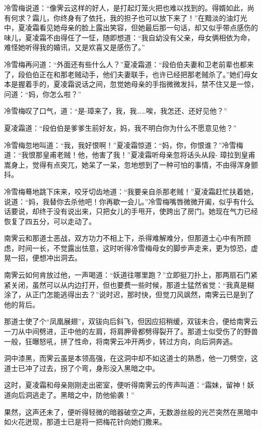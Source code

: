 \documentclass[12pt,oneside]{book}
\begin{document}
冷雪梅说道：``像霁云这样的好人，是打起灯笼火把也难以找到的。得婿如此，尚有何求？霜儿，你终身有了依托，我的担子也可以放下来了！''在黯淡的油灯光中，夏凌霜看见她母亲的脸上露出笑容，但她最后那一句话，却又似乎带点感伤的味儿，夏凌霜不由得任了一怔，随即想道：``我自幼没有父亲，母女俩相依为命，难怪她听得我的婚讯，又是欢喜又是感伤了。''

冷雪梅再问道：``外面还有些什么人？''夏凌霜道：``段伯伯夫妻和卫老前辈也都来了，段伯伯正在和那老贼动手，他们夫妻联手，也许已经把那老贼杀了。''她们母女本是握着手的，夏凌霜说话之间，忽觉她母亲的手指微微发抖，禁不住又是一惊，问道：``妈，你怎么啦？''

冷雪梅叹了口气，道：``是-璋来了，我，我\ldots\ldots 唉，我怎还、还好见他？''

夏凌霜道：``段伯伯是爹爹生前好友，妈，我不明白你为什么不愿意见他？''

冷雪梅忽地叫道：``我，我好恨啊！''夏凌霜惊道：``妈，你，你恨谁？''冷雪梅道：``我恨那皇甫老贼！他，他害了我！''夏凌霜听母亲忽将话头从段-
璋拉到皇甫嵩身上，觉得有点突兀，她呆了一呆，忽地想到了一种可怕的事情，不由得浑身颤抖。

冷雪梅蓦地跳下床来，咬牙切齿地道：``我要亲自杀那老贼！''夏凌霜赶忙扶着她，说道：``妈，我替你去杀他吧！你再歇一会儿。''冷雪梅嘴唇微微开阖，似乎有什么话要说，却终于没有说出来，只把女儿的手甩开，使跨出了房门。她现在气力已经恢复了四五分，可以走动了。

南霁云和那道士恶战，双方功力不相上下，杀得难解难分，但那道士心中有所顾虑，时间一长，不觉露出怯意，这时听得冷雪梅母女的脚步声走来，更为惊恐，虚晃一招，便想冲出洞去。

南霁云如何肯放过他，一声喝道：``妖道往哪里跑？''立即挺刀扑上，那两扇石门紧紧关闭，虽然可以从内边打开，但也要费一些时候，那道士猛然省觉：``我真是糊涂了，从正门怎能逃得出去？''说时迟，那时快，但觉刀风飒然，南霁云已是到了他的背后。

那道士使了个``凤凰展翅''，双钹向后斜飞，但因应招稍缓，双钹未合，便给南霁云一刀从中间劈进，正中他的左肩，将肩胛骨都劈得裂开了。那道士似受伤了的野兽一般，狂曝怒吼，拼了性命，将南霁云冲开两步，转过方向，向后洞奔逃。

洞中漆黑，而霁云虽是本领高强，在这洞中却不如这道士的熟悉，他一刀劈空，这道士已冲了过去，拐了个弯，身形没入黑暗之中。

这时，夏凌霜和母亲刚刚走出密室，便听得南霁云的传声叫道：``霜妹，留神！妖道向后洞逃走了。黑暗之中，防他偷袭！''

果然，这声还未了，便听得轻微的暗器破空之声，无数游丝般的光芒突然在黑暗中如火花迸现，那道士已是将一把梅花针向她们撒来。
\end{document}
